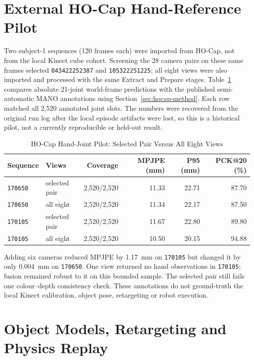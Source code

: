 \section{External HO-Cap Hand-Reference Pilot}
\label{sec:hocap-results}

Two subject-1 sequences (120 frames each) were imported from HO-Cap, not from
the local Kinect cube cohort. Screening the 28 camera pairs on these same
frames selected \texttt{043422252387} and \texttt{105322251225}; all eight
views were also imported and processed with the same Extract and Prepare
stages. Table~\ref{tab:hocap-hand} compares absolute 21-joint world-frame
predictions with the published semi-automatic MANO annotations using
Section~\ref{sec:hocap-method}. Each row matched all 2,520 annotated joint
slots. The numbers were recovered from the original run log after the local
episode artifacts were lost, so this is a historical pilot, not a currently
reproducible or held-out result.

\begin{table}[htbp]
\caption{HO-Cap Hand-Joint Pilot: Selected Pair Versus All Eight Views}
\label{tab:hocap-hand}
\centering\small
\begin{tabular}{llrrrr}
\toprule
Sequence & Views & Coverage & MPJPE (mm) & P95 (mm) & PCK@20 (\%) \\
\midrule
\texttt{170650} & selected pair & 2,520/2,520 & 11.33 & 22.71 & 87.70 \\
\texttt{170650} & all eight & 2,520/2,520 & 11.34 & 22.17 & 87.50 \\
\texttt{170105} & selected pair & 2,520/2,520 & 11.67 & 22.80 & 89.80 \\
\texttt{170105} & all eight & 2,520/2,520 & 10.50 & 20.15 & 94.88 \\
\bottomrule
\end{tabular}
\end{table}

Adding six cameras reduced MPJPE by 1.17~mm on \texttt{170105} but changed it
by only 0.004~mm on \texttt{170650}. One view returned no hand observations
in \texttt{170105}; fusion remained robust to it on this bounded sample.
The selected pair still fails one colour--depth consistency check. These
annotations do not ground-truth the local Kinect calibration, object pose,
retargeting or robot execution.

\section{Object Models, Retargeting and Physics Replay}
\label{sec:object-replay}

